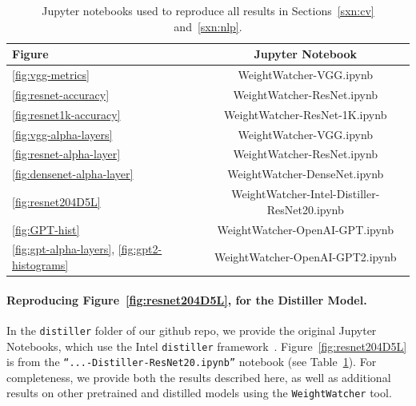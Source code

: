 \begin{table}[t]
\small
\begin{center}
\begin{tabular}{|p{1in}|c|}
\hline
Figure & Jupyter Notebook \\
\hline
\ref{fig:vgg-metrics}                                 & WeightWatcher-VGG.ipynb \\
\ref{fig:resnet-accuracy}                             & WeightWatcher-ResNet.ipynb \\
\ref{fig:resnet1k-accuracy}                           & WeightWatcher-ResNet-1K.ipynb \\
\ref{fig:vgg-alpha-layers}                            & WeightWatcher-VGG.ipynb \\
\ref{fig:resnet-alpha-layer}                          & WeightWatcher-ResNet.ipynb \\
\ref{fig:densenet-alpha-layer}                        & WeightWatcher-DenseNet.ipynb \\
\hline
\ref{fig:resnet204D5L}                                & WeightWatcher-Intel-Distiller-ResNet20.ipynb \\
\hline
\ref{fig:GPT-hist}                                    & WeightWatcher-OpenAI-GPT.ipynb \\
\ref{fig:gpt-alpha-layers}, \ref{fig:gpt2-histograms} & WeightWatcher-OpenAI-GPT2.ipynb \\
\hline
\end{tabular}
\end{center}
\caption{Jupyter notebooks used to reproduce all results in Sections~\ref{sxn:cv} and~\ref{sxn:nlp}.}
\label{table:notebooks}
\end{table}


\paragraph{Reproducing Figure~\ref{fig:resnet204D5L}, for the Distiller Model.}

In the \texttt{distiller} folder of our github repo, 
we provide the original Jupyter Notebooks, which use the Intel \texttt{distiller} framework~\cite{distiller}.   %
Figure~\ref{fig:resnet204D5L} is from the  \texttt{``...-Distiller-ResNet20.ipynb''} notebook (see Table~\ref{table:notebooks}).  
For completeness, we provide both the results described here, as well as additional results on other pretrained and distilled models using the \texttt{WeightWatcher} tool.


